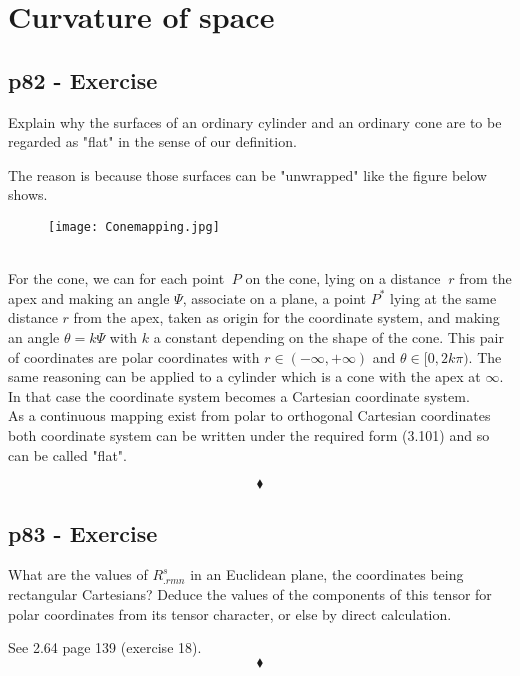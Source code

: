 \chapter{Curvature of space}
\pagebreak[4]

\section{p82 - Exercise}
\begin{tcolorbox}
Explain why the surfaces of an ordinary cylinder and an ordinary cone are to be regarded as "flat" in the sense of our definition.
\end{tcolorbox}
The reason is because those surfaces can be "unwrapped" like the figure below shows. 
\begin{figure}[h]
\begin{minipage}[t]{.4\textwidth}
\vspace{0pt}
\texttt{[image: Conemapping.jpg]}
\end{minipage}\hfill
\end{figure}\\
For the cone, we can for each point $\ P $ on the cone, lying on a distance $\ r $ from the apex and making an angle $\Psi $,  associate on a plane,  a  point $ P^* $ lying at the same  distance $ r $ from the apex, taken as origin for the coordinate system, and making an angle $\theta =  k\Psi $ with $ k $ a constant depending on the shape of the cone. This pair of coordinates are polar coordinates with $ r \in (-\infty, + \infty)$ and $\theta \in [0, 2k\pi)$. 
The same reasoning can be applied to a cylinder which is a cone with the apex at $\infty$. In that case the coordinate system becomes a Cartesian coordinate system. \\
As a continuous mapping exist from polar to orthogonal Cartesian coordinates both  coordinate system can be written under the required form (3.101) and so can be called "flat".

$$\blacklozenge$$
\newpage

\section{p83 - Exercise}
\begin{tcolorbox}
What are the values of $R^s_{.rmn}$ in an Euclidean plane, the coordinates being rectangular Cartesians? Deduce the values of the components of this tensor for polar coordinates from its tensor character, or else by direct calculation.
\end{tcolorbox}
See 2.64 page 139 (exercise 18).
$$\blacklozenge$$
\newpage

